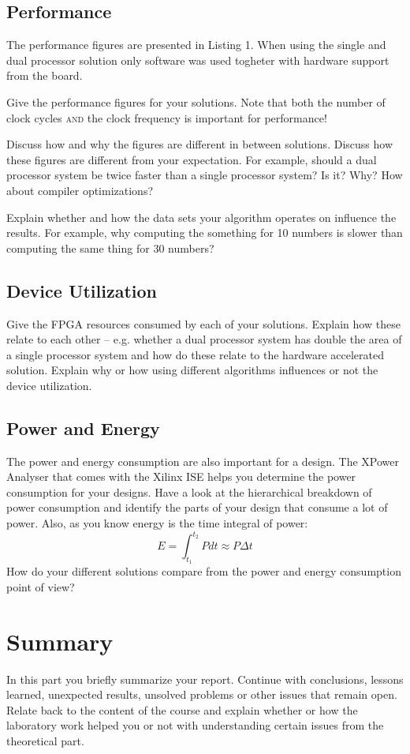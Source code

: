 \documentclass[11pt]{article}
\begin{document}
\subsection{Performance}
The performance figures are presented in Listing 1. When using the single and dual processor solution only software was used togheter with hardware support from the board.

Give the performance figures for your solutions. Note that both the number of clock cycles \textsc{and} the clock frequency is important for performance! 

Discuss how and why the figures are different in between solutions. Discuss how these figures are different from your expectation. For example, should a dual processor system be twice faster than a single processor system? Is it? Why?
How about compiler optimizations? 

Explain whether and how the data sets your algorithm operates on influence the results. For example, why computing the something for 10 numbers is slower than computing the same thing for 30 numbers?

\subsection{Device Utilization}
Give the FPGA resources consumed by each of your solutions. Explain how these relate to each other -- e.g. whether a dual processor system has double the area of a single processor system and how do these relate to the hardware accelerated solution. Explain why or how using different algorithms influences or not the device utilization.

\subsection{Power and Energy}
The power and energy consumption are also important for a design. The XPower Analyser that comes with the Xilinx ISE helps you determine the power consumption for your designs. Have a look at the hierarchical breakdown of power consumption and identify the parts of your design that consume a lot of power. Also, as you know energy is the time integral of power:
\begin{equation}
E = \int_{t_1}^{t_2} P dt \approx P \Delta t
\end{equation}
How do your different solutions compare from the power and energy consumption point of view?

\section{Summary}
In this part you briefly summarize your report. Continue with conclusions, lessons learned, unexpected results, unsolved problems or other issues that remain open. Relate back to the content of the course and explain whether or how the laboratory work helped you or not with understanding certain issues from the theoretical part.



\end{document}
